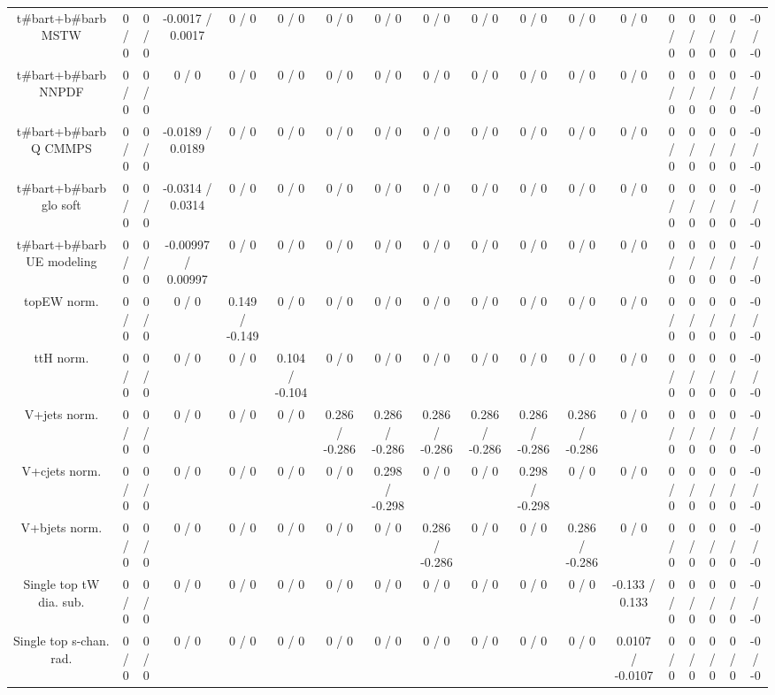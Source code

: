 \documentclass[10pt]{article}
\begin{document}
\begin{table}[htbp]
\begin{center}
\begin{tabular}{|c|c|c|c|c|c|c|c|c|c|c|c|c|c|c|c|c|c|}
  t#bar{t}+b#bar{b} MSTW & 0 / 0 & 0 / 0 & -0.0017 / 0.0017 & 0 / 0 & 0 / 0 & 0 / 0 & 0 / 0 & 0 / 0 & 0 / 0 & 0 / 0 & 0 / 0 & 0 / 0 & 0 / 0 & 0 / 0 & 0 / 0 & 0 / 0 & -0 / -0 \\ 
  t#bar{t}+b#bar{b} NNPDF & 0 / 0 & 0 / 0 & 0 / 0 & 0 / 0 & 0 / 0 & 0 / 0 & 0 / 0 & 0 / 0 & 0 / 0 & 0 / 0 & 0 / 0 & 0 / 0 & 0 / 0 & 0 / 0 & 0 / 0 & 0 / 0 & -0 / -0 \\ 
  t#bar{t}+b#bar{b} Q CMMPS & 0 / 0 & 0 / 0 & -0.0189 / 0.0189 & 0 / 0 & 0 / 0 & 0 / 0 & 0 / 0 & 0 / 0 & 0 / 0 & 0 / 0 & 0 / 0 & 0 / 0 & 0 / 0 & 0 / 0 & 0 / 0 & 0 / 0 & -0 / -0 \\ 
  t#bar{t}+b#bar{b} glo soft & 0 / 0 & 0 / 0 & -0.0314 / 0.0314 & 0 / 0 & 0 / 0 & 0 / 0 & 0 / 0 & 0 / 0 & 0 / 0 & 0 / 0 & 0 / 0 & 0 / 0 & 0 / 0 & 0 / 0 & 0 / 0 & 0 / 0 & -0 / -0 \\ 
  t#bar{t}+b#bar{b} UE modeling & 0 / 0 & 0 / 0 & -0.00997 / 0.00997 & 0 / 0 & 0 / 0 & 0 / 0 & 0 / 0 & 0 / 0 & 0 / 0 & 0 / 0 & 0 / 0 & 0 / 0 & 0 / 0 & 0 / 0 & 0 / 0 & 0 / 0 & -0 / -0 \\ 
  topEW norm. & 0 / 0 & 0 / 0 & 0 / 0 & 0.149 / -0.149 & 0 / 0 & 0 / 0 & 0 / 0 & 0 / 0 & 0 / 0 & 0 / 0 & 0 / 0 & 0 / 0 & 0 / 0 & 0 / 0 & 0 / 0 & 0 / 0 & -0 / -0 \\ 
  ttH norm. & 0 / 0 & 0 / 0 & 0 / 0 & 0 / 0 & 0.104 / -0.104 & 0 / 0 & 0 / 0 & 0 / 0 & 0 / 0 & 0 / 0 & 0 / 0 & 0 / 0 & 0 / 0 & 0 / 0 & 0 / 0 & 0 / 0 & -0 / -0 \\ 
  V+jets norm. & 0 / 0 & 0 / 0 & 0 / 0 & 0 / 0 & 0 / 0 & 0.286 / -0.286 & 0.286 / -0.286 & 0.286 / -0.286 & 0.286 / -0.286 & 0.286 / -0.286 & 0.286 / -0.286 & 0 / 0 & 0 / 0 & 0 / 0 & 0 / 0 & 0 / 0 & -0 / -0 \\ 
  V+cjets norm. & 0 / 0 & 0 / 0 & 0 / 0 & 0 / 0 & 0 / 0 & 0 / 0 & 0.298 / -0.298 & 0 / 0 & 0 / 0 & 0.298 / -0.298 & 0 / 0 & 0 / 0 & 0 / 0 & 0 / 0 & 0 / 0 & 0 / 0 & -0 / -0 \\ 
  V+bjets norm. & 0 / 0 & 0 / 0 & 0 / 0 & 0 / 0 & 0 / 0 & 0 / 0 & 0 / 0 & 0.286 / -0.286 & 0 / 0 & 0 / 0 & 0.286 / -0.286 & 0 / 0 & 0 / 0 & 0 / 0 & 0 / 0 & 0 / 0 & -0 / -0 \\ 
  Single top tW dia. sub. & 0 / 0 & 0 / 0 & 0 / 0 & 0 / 0 & 0 / 0 & 0 / 0 & 0 / 0 & 0 / 0 & 0 / 0 & 0 / 0 & 0 / 0 & -0.133 / 0.133 & 0 / 0 & 0 / 0 & 0 / 0 & 0 / 0 & -0 / -0 \\ 
  Single top s-chan. rad. & 0 / 0 & 0 / 0 & 0 / 0 & 0 / 0 & 0 / 0 & 0 / 0 & 0 / 0 & 0 / 0 & 0 / 0 & 0 / 0 & 0 / 0 & 0.0107 / -0.0107 & 0 / 0 & 0 / 0 & 0 / 0 & 0 / 0 & -0 / -0 \\ 

\end{tabular}
\end{center}
\end{table}
\end{document}

